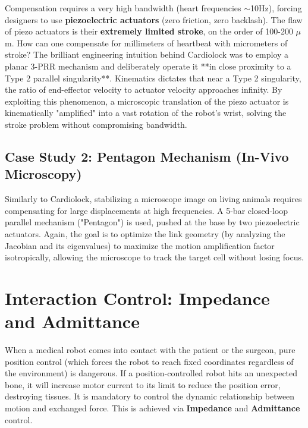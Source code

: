 \documentclass[11pt,a4paper,twoside]{report}
\begin{document}
Compensation requires a very high bandwidth (heart frequencies $\sim$10Hz), forcing designers to use \textbf{piezoelectric actuators} (zero friction, zero backlash). The flaw of piezo actuators is their \textbf{extremely limited stroke}, on the order of 100-200 $\mu$m. How can one compensate for millimeters of heartbeat with micrometers of stroke?
The brilliant engineering intuition behind Cardiolock was to employ a planar 3-PRR mechanism and deliberately operate it **in close proximity to a Type 2 parallel singularity**. Kinematics dictates that near a Type 2 singularity, the ratio of end-effector velocity to actuator velocity approaches infinity. By exploiting this phenomenon, a microscopic translation of the piezo actuator is kinematically "amplified" into a vast rotation of the robot's wrist, solving the stroke problem without compromising bandwidth.

\section{Case Study 2: Pentagon Mechanism (In-Vivo Microscopy)}
Similarly to Cardiolock, stabilizing a microscope image on living animals requires compensating for large displacements at high frequencies. A 5-bar closed-loop parallel mechanism ("Pentagon") is used, pushed at the base by two piezoelectric actuators. Again, the goal is to optimize the link geometry (by analyzing the Jacobian and its eigenvalues) to maximize the motion amplification factor isotropically, allowing the microscope to track the target cell without losing focus.

\chapter{Interaction Control: Impedance and Admittance}

When a medical robot comes into contact with the patient or the surgeon, pure position control (which forces the robot to reach fixed coordinates regardless of the environment) is dangerous. If a position-controlled robot hits an unexpected bone, it will increase motor current to its limit to reduce the position error, destroying tissues. It is mandatory to control the dynamic relationship between motion and exchanged force. This is achieved via \textbf{Impedance} and \textbf{Admittance} control.
\end{document}
